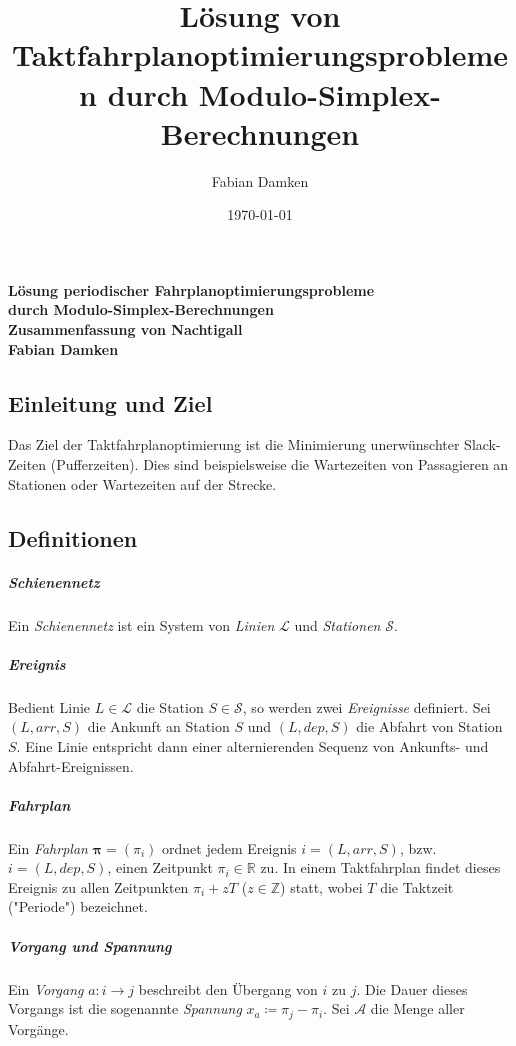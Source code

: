 \documentclass[a4paper, 10pt, twocolumn]{scrartcl}
\title{Lösung von Taktfahrplanoptimierungsproblemen durch Modulo-Simplex-Berechnungen}
\author{Fabian Damken}
\date{\today}
\newcommand{\arr}{\mathit{arr}}
\newcommand{\dep}{\mathit{dep}}
\newcommand{\R}{\ensuremath{\mathbb{R}}}
\newcommand{\Z}{\ensuremath{\mathbb{Z}}}
\renewcommand{\vec}[1]{\boldsymbol{#1}}
\newcommand{\bzw}{bzw.~}
\begin{document}
	

	\makeatletter
	\begin{center}
		\textbf{\Large Lösung periodischer \mbox{Fahrplanoptimierungsprobleme} \\ \vspace{2mm} durch Modulo-Simplex-Berechnungen} \\ \vspace{2mm}
		\textbf{\large Zusammenfassung von Nachtigall} \\ \vspace{3mm}
		\textbf{\large Fabian Damken} \\ \vspace{1mm}
		{\large \@date}
	\end{center}
	\makeatother
	
	\subsection*{Einleitung und Ziel}
		Das Ziel der Taktfahrplanoptimierung ist die Minimierung unerwünschter Slack-Zeiten (Pufferzeiten). Dies sind beispielsweise die Wartezeiten von Passagieren an Stationen oder Wartezeiten auf der Strecke.

	\subsection*{Definitionen}
		\subparagraph{Schienennetz}
		Ein \emph{Schienennetz} ist ein System von \emph{Linien} \(\mathcal{L}\) und \emph{Stationen} \(\mathcal{S}\).
	
		\subparagraph{Ereignis}
		Bedient Linie \( L \in \mathcal{L} \) die Station \( S \in \mathcal{S} \), so werden zwei \emph{Ereignisse} definiert. Sei \( (L, \arr, S) \) die Ankunft an Station \(S\) und \( (L, \dep, S) \) die Abfahrt von Station \(S\). Eine Linie entspricht dann einer alternierenden Sequenz von Ankunfts- und Abfahrt-Ereignissen.
	
		\subparagraph{Fahrplan}
		Ein \emph{Fahrplan} \( \vec{\pi} = (\pi_i) \) ordnet jedem Ereignis \( i = (L, \arr, S) \), \bzw \( i = (L, \dep, S) \), einen Zeitpunkt \( \pi_i \in \R \) zu. In einem Taktfahrplan findet dieses Ereignis zu allen Zeitpunkten \( \pi_i + z T \) (\( z \in \Z \)) statt, wobei \( T \) die Taktzeit ("Periode") bezeichnet.
		
		\subparagraph{Vorgang und Spannung}
		Ein \emph{Vorgang} \( a : i \to j \) beschreibt den Übergang von \(i\) zu \(j\). Die Dauer dieses Vorgangs ist die sogenannte \emph{Spannung} \( x_a \coloneqq \pi_j - \pi_i \). Sei \(\mathcal{A}\) die Menge aller Vorgänge.
		
\end{document}
